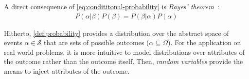 A direct consequence of \cref{eq:condititonal-probability} is \emph{Bayes' theorem}~\citep[15]{bishop_07_pattern}:
\begin{align}
    \label{eq:bayes-theorem}
    P(\alpha|\beta)P(\beta) = P(\beta|\alpha)P(\alpha)
\end{align}
    



Hitherto, \cref{def:probability} provides a distribution over the abstract space of events $\alpha
\in \mathcal{S}$ that are sets of possible outcomes ($\alpha \subseteq \Omega$). For the application
on real world problems, it is more intuitive to model distributions over attributes of the outcome
rather than the outcome itself. Then, \emph{random variables} provide the means to inject attributes
of the outcome.

